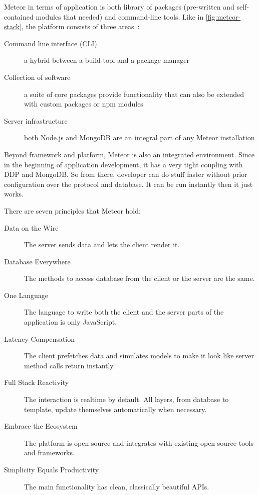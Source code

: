 Meteor in terms of application is both library of packages (pre-written and self-contained modules that needed) and command-line tools.
Like in \autoref{fig:meteor-stack}, the platform consists of three areas~\autocite{Hochhaus2014Meteor}:

\begin{description}
\item [Command line interface (CLI)] a hybrid between a build-tool and a package manager
\item [Collection of software] a suite of core packages provide functionality that can also be extended with custom packages or \ac{npm} modules
\item [Server infrastructure] both Node.js and MongoDB are an integral part of any Meteor installation
\end{description}

Beyond framework and platform, Meteor is also an integrated environment.
Since in the beginning of application development, it has a very tight coupling with \ac{DDP} and MongoDB.
So from there, developer can do stuff faster without prior configuration over the protocol and database.
It can be run instantly then it just works.

\noindent There are seven principles that Meteor hold:

\begin{description}
\item [Data on the Wire] The server sends data and lets the client render it.
\item [Database Everywhere] The methods to access database from the client or the server are the same.
\item [One Language] The language to write both the client and the server parts of the application is only JavaScript.
\item [Latency Compensation] The client prefetches data and simulates models to make it look like server method calls return instantly.
\item [Full Stack Reactivity] The interaction is realtime by default. All layers, from database to template, update themselves automatically when necessary.
\item [Embrace the Ecosystem] The platform is open source and integrates with existing open source tools and frameworks.
\item [Simplicity Equals Productivity]  The main functionality has clean, classically beautiful APIs.
\end{description}

